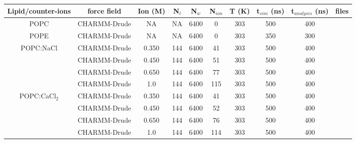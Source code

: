 \documentclass[journal=jacsat,manuscript=article,layout=singlecolumn]{achemso}
\begin{document}
\newpage
\begin{table}[]
\begin{tabular}{cccccccccc}
	Lipid/counter-ions                & force field  & Ion (M) & N$_{l}$ & N$_{w}$ & N$_{ion}$ & T (K) & t$_{sim}$ (ns) & t$_{analysis}$ (ns) & files \\ \hline
POPC                              & CHARMM-Drude & NA      & NA       & 6400       & 0         & 303    & 500              & 400         &          \cite{kav_batuhan_2021_4604630}    \\ \hline
POPE                              & CHARMM-Drude & NA      & NA       & 6400       & 0         & 303    & 350              & 300         &          \cite{kav_batuhan_2021_4665773}    \\ \hline
	\multirow{4}{*}{POPC:NaCl}        & CHARMM-Drude & 0.350   & 144      & 6400     & 41         & 303   & 500             & 400                  & \cite{kav_batuhan_2020_4683386}   \\
				  & CHARMM-Drude & 0.450   & 144      & 6400     & 51         & 303   & 500             & 400                  & \cite{kav_batuhan_2020_4683398}   \\
				  & CHARMM-Drude & 0.650   & 144      & 6400     & 77         & 303   & 500             & 400                  & \cite{kav_batuhan_2020_4683405}   \\
				  & CHARMM-Drude & 1.0     & 144      & 6400     & 115        & 303   & 500             & 400                  & \cite{kav_batuhan_2020_4683411}   \\ \hline
	\multirow{3}{*}{POPC:CaCl$_{2}$} & CHARMM-Drude & 0.350   & 144      & 6400     & 41         & 303   & 500             & 400                  & \cite{kav_batuhan_2020_4683393}   \\
				  & CHARMM-Drude & 0.450   & 144      & 6400     & 52         & 303   & 500             & 400                  & \cite{kav_batuhan_2020_4683391}   \\
				  & CHARMM-Drude & 0.650   & 144      & 6400     & 76         & 303   & 500             & 400                  & \cite{kav_batuhan_2020_4683394} \\
				  & CHARMM-Drude & 1.0   & 144      & 6400     & 114         & 303   & 500             & 400                  & \cite{kav_batuhan_2021_4738966}
				  
\end{tabular}
\end{table}
\end{document}

